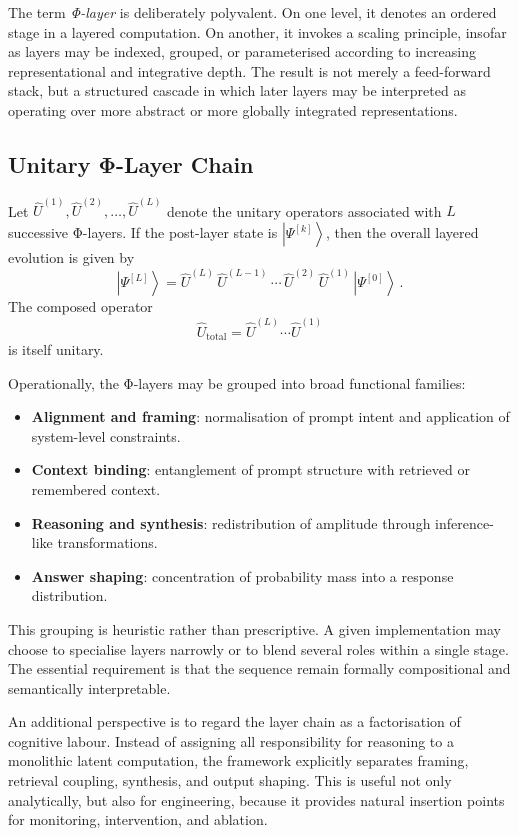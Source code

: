 \documentclass[12pt]{article}
\newcommand{\ket}[1]{\left|#1\right\rangle}
\begin{document}
The term \emph{Φ-layer} is deliberately polyvalent. On one level, it denotes an ordered stage in a layered computation. On another, it invokes a scaling principle, insofar as layers may be indexed, grouped, or parameterised according to increasing representational and integrative depth. The result is not merely a feed-forward stack, but a structured cascade in which later layers may be interpreted as operating over more abstract or more globally integrated representations.

\subsection{Unitary Φ-Layer Chain}
Let $\hat{U}^{(1)}, \hat{U}^{(2)}, \dots, \hat{U}^{(L)}$ denote the unitary operators associated with $L$ successive Φ-layers. If the post-layer state is $\ket{\Psi^{[k]}}$, then the overall layered evolution is given by
\begin{equation}\label{eq:layer-chain}
\ket{\Psi^{[L]}} = \hat{U}^{(L)}\,\hat{U}^{(L-1)}\,\cdots\,\hat{U}^{(2)}\,\hat{U}^{(1)}\,\ket{\Psi^{[0]}}\,.
\end{equation}
The composed operator
\begin{equation}
\hat{U}_{\text{total}} = \hat{U}^{(L)}\cdots\hat{U}^{(1)}
\end{equation}
is itself unitary.

Operationally, the Φ-layers may be grouped into broad functional families:
\begin{itemize}[leftmargin=2em]
    \item \textbf{Alignment and framing}: normalisation of prompt intent and application of system-level constraints.
    \item \textbf{Context binding}: entanglement of prompt structure with retrieved or remembered context.
    \item \textbf{Reasoning and synthesis}: redistribution of amplitude through inference-like transformations.
    \item \textbf{Answer shaping}: concentration of probability mass into a response distribution.
\end{itemize}
This grouping is heuristic rather than prescriptive. A given implementation may choose to specialise layers narrowly or to blend several roles within a single stage. The essential requirement is that the sequence remain formally compositional and semantically interpretable.

An additional perspective is to regard the layer chain as a factorisation of cognitive labour. Instead of assigning all responsibility for reasoning to a monolithic latent computation, the framework explicitly separates framing, retrieval coupling, synthesis, and output shaping. This is useful not only analytically, but also for engineering, because it provides natural insertion points for monitoring, intervention, and ablation.
\end{document}
